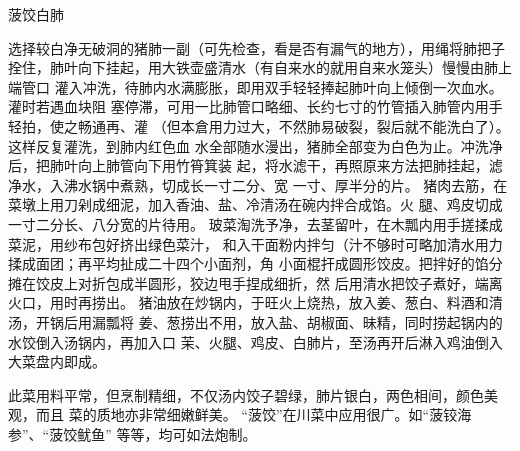 \begin{recipe}[菠饺银肺]{菠饺白肺}

\ingredients


\cooking

\step 选择较白净无破洞的猪肺一副（可先检查，看是否有漏气的地方），用绳将肺把子
拴住，肺叶向下挂起，用大铁壶盛清水（有自来水的就用自来水笼头）慢慢由肺上端管口
灌入冲洗，待肺内水满膨胀，即用双手轻轻捧起肺叶向上倾倒一次血水。灌时若遇血块阻
塞停滞，可用一比肺管口略细、长约七寸的竹管插入肺管内用手轻拍，使之畅通再、灌
（但本倉用力过大，不然肺易破裂，裂后就不能洗白了）。这样反复灌洗，到肺内红色血
水全部随水漫出，猪肺全部变为白色为止。冲洗净后，把肺叶向上肺管向下用竹筲箕装
起，将水滤干，再照原来方法把肺挂起，滤净水，入沸水锅中煮熟，切成长一寸二分、宽
一寸、厚半分的片。
\step 猪肉去筋，在菜墩上用刀剁成细泥，加入香油、盐、冷清汤在碗内拌合成馅。火
腿、鸡皮切成一寸二分长、八分宽的片待用。
\step 玻菜淘洗予净，去茎留叶，在木瓢内用手搓揉成菜泥，用纱布包好挤出绿色菜汁，
和入干面粉内拌匀（汁不够时可略加清水用力揉成面团；再平均扯成二十四个小面剂，角
小面棍扞成圆形饺皮。把拌好的馅分摊在饺皮上对折包成半圆形，狡边甩手捏成细折，然
后用清水把饺子煮好，端离火口，用时再捞出。
\step 猪油放在炒锅内，于旺火上烧热，放入姜、葱白、料酒和清汤，开锅后用漏瓢将
姜、葱捞出不用，放入盐、胡椒面、昧精，同时捞起锅内的水饺倒入汤锅内，再加入口
茉、火腿、鸡皮、白肺片，至汤再开后淋入鸡油倒入大菜盘内即成。

\notes

此菜用料平常，但烹制精细，不仅汤内饺子碧绿，肺片银白，两色相间，颜色美观，而且
菜的质地亦非常细嫩鲜美。 “菠饺”在川菜中应用很广。如“菠铰海参”、“菠饺鱿鱼”
等等，均可如法炮制。

\end{recipe}

